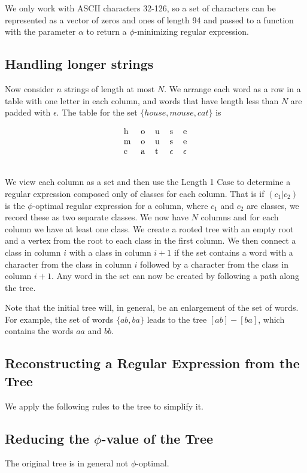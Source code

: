 \documentclass[11pt, oneside]{article}   	%
\theoremstyle{definition}
\begin{document}
We only work with ASCII characters 32-126, so a set of characters can be represented as a vector of zeros and ones of length 94 and passed to a function with the parameter $\alpha$ to return a $\phi$-minimizing regular expression.


\subsection{Handling longer strings}

Now consider $n$ strings of length at most $N$. We arrange each word as a row in a table with one letter in each column, and words that have length less than $N$ are padded with $\epsilon$. 
The table for the set $\{house, mouse, cat\}$ is

\begin{equation}
\begin{tabular}{lllll}
h & o & u & s       & e       \\
m & o & u & s       & e       \\
c & a & t & $\epsilon$ & $\epsilon$ \\
  &   &   &         &        
\end{tabular}
\end{equation}


We view each column as a set and then use the Length 1 Case to determine a regular expression composed only of classes for each column. That is if $(c_1|c_2)$ is the $\phi$-optimal regular expression for a column, where $c_1$ and $c_2$ are classes, we record these as two separate classes. 
We now have $N$ columns and for each column we have at least one class. 
We create a rooted tree with an empty root and a vertex from the root to each class in the first column. 
We then connect a class in column $i$ with a class in column $i+1$ if the set contains a word with a character from the class in column $i$ followed by a character from the class in column $i+1$. 
Any word in the set can now be created by following a path along the tree. 

Note that the initial tree will, in general, be an enlargement of the set of words. 
For example, the set of words $\{ab,ba\}$ leads to the tree $[ab]-[ba]$, which contains the words $aa$ and $bb$.

\subsection{Reconstructing a Regular Expression from the Tree}
We apply the following rules to the tree to simplify it. 

\subsection{Reducing the $\phi$-value of the Tree}

The original tree is in general not $\phi$-optimal.
\end{document}
